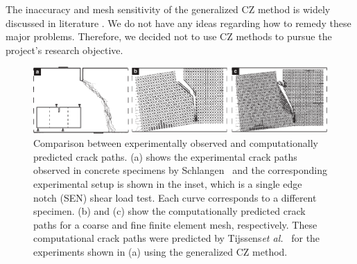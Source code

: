 \documentclass[10pt,letterpaper]{article}
\begin{document}
    The inaccuracy and  mesh sensitivity of the generalized CZ method is widely discussed in literature \cite{de2003numerical,de2004computational,tijssens2000numerical,song2008comparative}. We do not have any ideas regarding how to remedy these major problems. Therefore, we decided not to use CZ methods to pursue the project's research objective.
%
    \begin{figure}[h!]
          \centering
          \includegraphics[width=\textwidth]{Figures/CZM/CZM_crack_path_ver3.pdf}
          \caption{\footnotesize Comparison between experimentally observed and computationally predicted crack paths. (a) shows the experimental crack paths observed in concrete specimens by Schlangen~\cite{schlangen1993experimental} and the corresponding experimental setup is shown in the inset, which is a single edge notch (SEN) shear load test. Each curve corresponds to a different specimen. (b) and (c) show the computationally predicted crack paths for a coarse and fine finite  element mesh, respectively. These computational crack paths  were predicted by Tijssens\textit{et al.}~\cite{tijssens2000numerical} for the experiments shown in (a) using the generalized CZ method.}
          \label{f:czm}
    \end{figure}

\end{document}
